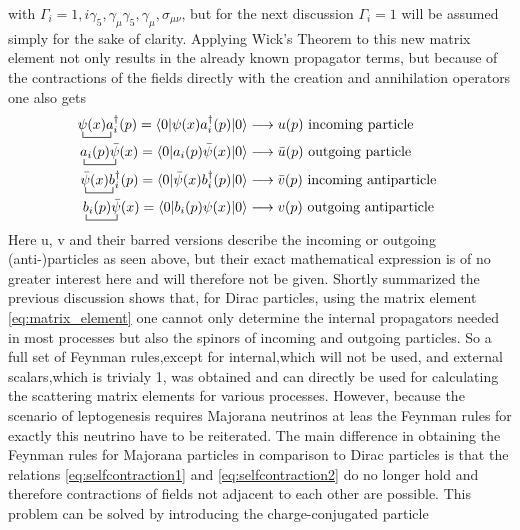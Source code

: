with $\Gamma_i=1,i\gamma_5,\gamma_\mu\gamma_5,\gamma_\mu,\sigma_{\mu\nu}$, but for the next discussion $\Gamma_i=1$ will be assumed simply for the sake of clarity. \newline
Applying Wick's Theorem to this new matrix element not only results in the already known propagator terms, but because of the contractions of the fields directly with the creation and annihilation operators one also gets \cite[p. 471]{Denner:1992vza}
\begin{align*}
		\bcontraction{}{\psi}{(x)}{a}\psi(x) a_i^\dagger(p)=\braket{0|\psi(x) a_i^\dagger(p)|0}&\longrightarrow u(p) \text{ incoming particle }\\
		\bcontraction{}{a}{{}_i(p)}{\bar{\psi}}a_i(p)\bar{\psi}(x)=\braket{0|a_i(p)\bar{\psi}(x)|0}&\longrightarrow \bar{u}(p) \text{ outgoing particle }\\
		\bcontraction{}{\bar{\psi}}{(x)}{b}\bar{\psi}(x) b_i^\dagger(p)=\braket{0|\bar{\psi}(x) b_i^\dagger(p)|0}&\longrightarrow \bar{v}(p)\text{ incoming antiparticle }\\
		\bcontraction{}{b}{{}_i(p)}{\psi}b_i(p)\bar{\psi}(x)=\braket{0|b_i(p)\psi(x)|0}&\longrightarrow v(p)\text{ outgoing antiparticle }
\end{align*}
Here u, v and their barred versions describe the incoming or outgoing (anti-)particles as seen above, but their exact mathematical expression is of no greater interest here and will therefore not be given. \newline
Shortly summarized the previous discussion shows that, for Dirac particles, using the matrix element \ref{eq:matrix_element} one cannot only determine the internal propagators needed in most processes but also the spinors of incoming and outgoing particles. So a full set of Feynman rules,except for internal,which will not be used, and external scalars,which is trivialy 1, was obtained and can directly be used for calculating the scattering matrix elements for various processes. \newline
However, because the scenario of leptogenesis requires Majorana neutrinos at leas the Feynman rules for exactly this neutrino have to be reiterated. The main difference in obtaining the Feynman rules for Majorana particles in comparison to Dirac particles is that the relations \ref{eq:selfcontraction1} and \ref{eq:selfcontraction2} do no longer hold and therefore contractions of fields not adjacent to each other are possible. \newline
This problem can be solved by introducing the charge-conjugated particle 
